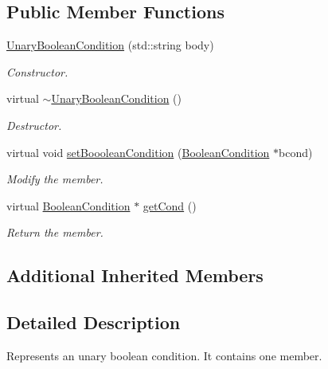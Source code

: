 \subsection*{Public Member Functions}
\begin{DoxyCompactItemize}
\item 
\hyperlink{class_unary_boolean_condition_a824a0171589b68add7c6f31cb05febe1}{Unary\-Boolean\-Condition} (std\-::string body)
\begin{DoxyCompactList}\small\item\em Constructor. \end{DoxyCompactList}\item 
\hypertarget{class_unary_boolean_condition_a1e7896edbf2f52cb4471c53adef7f19e}{virtual \hyperlink{class_unary_boolean_condition_a1e7896edbf2f52cb4471c53adef7f19e}{$\sim$\-Unary\-Boolean\-Condition} ()}\label{class_unary_boolean_condition_a1e7896edbf2f52cb4471c53adef7f19e}

\begin{DoxyCompactList}\small\item\em Destructor. \end{DoxyCompactList}\item 
virtual void \hyperlink{class_unary_boolean_condition_a9927df5d1c8f15fbf1140699c2af7fb7}{set\-Booolean\-Condition} (\hyperlink{class_boolean_condition}{Boolean\-Condition} $\ast$bcond)
\begin{DoxyCompactList}\small\item\em Modify the member. \end{DoxyCompactList}\item 
virtual \hyperlink{class_boolean_condition}{Boolean\-Condition} $\ast$ \hyperlink{class_unary_boolean_condition_a200ba843f7570df93615f37632925db4}{get\-Cond} ()
\begin{DoxyCompactList}\small\item\em Return the member. \end{DoxyCompactList}\end{DoxyCompactItemize}
\subsection*{Additional Inherited Members}


\subsection{Detailed Description}
Represents an unary boolean condition. It contains one member. 

